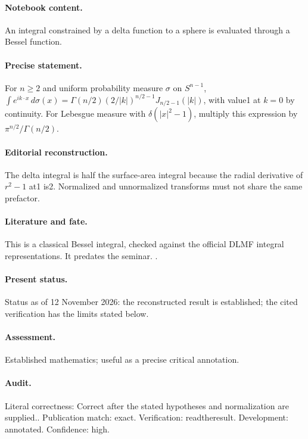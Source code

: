 \paragraph{Notebook content.} An integral constrained by a delta function to a sphere is evaluated through a Bessel function.

\paragraph{Precise statement.} For $n\ge2$ and uniform probability measure $\sigma$ on $S^{n-1}$, $\int e^{ik\cdot x}\,d\sigma(x)=\Gamma(n/2)(2/|k|)^{n/2-1}J_{n/2-1}(|k|)$, with value1 at $k=0$ by continuity. For Lebesgue measure with $\delta(|x|^2-1)$, multiply this expression by $\pi^{n/2}/\Gamma(n/2)$.

\paragraph{Editorial reconstruction.} The delta integral is half the surface-area integral because the radial derivative of $r^2-1$ at1 is2. Normalized and unnormalized transforms must not share the same prefactor.

\paragraph{Literature and fate.} This is a classical Bessel integral, checked against the official DLMF integral representations. It predates the seminar. \citep{nist2026bessel}.

\paragraph{Present status.} Status as of 12 November 2026: the reconstructed result is established; the cited verification has the limits stated below.

\paragraph{Assessment.} Established mathematics; useful as a precise critical annotation.

\paragraph{Audit.} Literal correctness: Correct after the stated hypotheses and normalization are supplied.. Publication match: exact. Verification: readtheresult. Development: annotated. Confidence: high.

